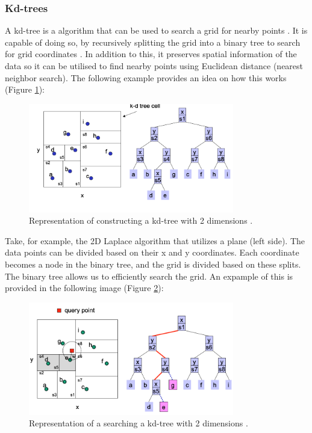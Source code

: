 \subsubsection*{Kd-trees} \label{theory:kd-trees}
A kd-tree is a algorithm that can be used to search a grid for nearby points \citep{bentley_multidimensional_1975}.
It is capable of doing so, by recursively splitting the grid into a binary tree to search for grid coordinates \citep{washington_k-d_2002}.
In addition to this, it preserves spatial information of the data so it can be utilised to find nearby points using Euclidean distance (nearest neighbor search).
The following example provides an idea on how this works (Figure \ref{fig:kd-tree-theory}):
\begin{figure}[H]
  \includegraphics[width=0.8\textwidth]{TheorethicalFramework/ND-Laplace/Images/kd-tree-part1.png}
  \caption{Representation of constructing a kd-tree with 2 dimensions \citep{washington_k-d_2002}.}
  \label{fig:kd-tree-theory}
\end{figure}
Take, for example, the 2D Laplace algorithm that utilizes a plane (left side).
The data points can be divided based on their x and y coordinates.
Each coordinate becomes a node in the binary tree, and the grid is divided based on these splits.
The binary tree allows us to efficiently search the grid. An expample of this is provided in the following image (Figure \ref{fig:kd-tree-searching-theory}):
\begin{figure}[H]
  \includegraphics[width=0.8\textwidth]{TheorethicalFramework/ND-Laplace/Images/kd-tree-part2.png}
  \caption{Representation of a searching a kd-tree with 2 dimensions \citep{washington_k-d_2002}.}
  \label{fig:kd-tree-searching-theory}
\end{figure}
